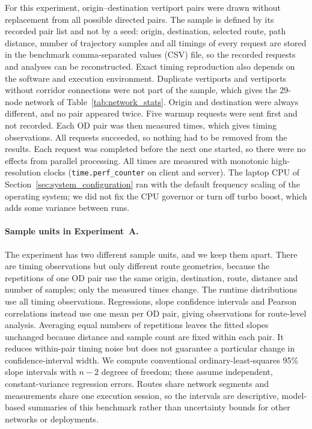 For this experiment, \paPairs{} origin--destination vertiport pairs were drawn without replacement from all possible directed pairs. The sample is defined by its recorded pair list and not by a seed: origin, destination, selected route, path distance, number of trajectory samples and all timings of every request are stored in the benchmark comma-separated values (CSV) file, so the recorded requests and analyses can be reconstructed. Exact timing reproduction also depends on the software and execution environment. Duplicate vertiports and vertiports without corridor connections were not part of the sample, which gives the 29-node network of Table~\ref{tab:network_stats}. Origin and destination were always different, and no pair appeared twice. Five warmup requests were sent first and not recorded. Each OD pair was then measured \paReps{} times, which gives \paObs{} timing observations. All requests succeeded, so nothing had to be removed from the results. Each request was completed before the next one started, so there were no effects from parallel processing. All times are measured with monotonic high-resolution clocks (\texttt{time.perf\_counter} on client and server). The laptop CPU of Section~\ref{sec:system_configuration} ran with the default frequency scaling of the operating system; we did not fix the CPU governor or turn off turbo boost, which adds some variance between runs.

\paragraph{Sample units in Experiment~A.}
The experiment has two different sample units, and we keep them apart. There are \paObs{} timing observations but only \paPairs{} different route geometries, because the \paReps{} repetitions of one OD pair use the same origin, destination, route, distance and number of samples; only the measured times change. The runtime distributions use all \paObs{} timing observations. Regressions, slope confidence intervals and Pearson correlations instead use one mean per OD pair, giving \paPairs{} observations for route-level analysis. Averaging equal numbers of repetitions leaves the fitted slopes unchanged because distance and sample count are fixed within each pair. It reduces within-pair timing noise but does not guarantee a particular change in confidence-interval width. We compute conventional ordinary-least-squares 95\% slope intervals with \(n-2\) degrees of freedom; these assume independent, constant-variance regression errors. Routes share network segments and measurements share one execution session, so the intervals are descriptive, model-based summaries of this benchmark rather than uncertainty bounds for other networks or deployments.

